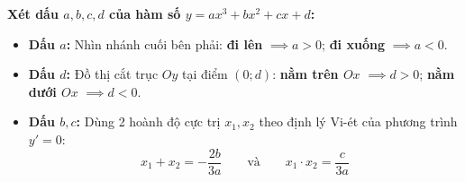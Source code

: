 \documentclass[12pt,a4paper]{article}
\begin{document}
\vspace{0.15cm}

\begin{theorybox}
    \textbf{Xét dấu $a, b, c, d$ của hàm số $y = ax^3 + bx^2 + cx + d$:}
    \begin{itemize}\setlength{\itemsep}{2pt}
        \item \textbf{Dấu $a$:} Nhìn nhánh cuối bên phải: \textbf{đi lên} $\implies a > 0$; \textbf{đi xuống} $\implies a < 0$.
        \item \textbf{Dấu $d$:} Đồ thị cắt trục $Oy$ tại điểm $(0; d)$: \textbf{nằm trên $Ox$} $\implies d > 0$; \textbf{nằm dưới $Ox$} $\implies d < 0$.
        \item \textbf{Dấu $b, c$:} Dùng 2 hoành độ cực trị $x_1, x_2$ theo định lý Vi-ét của phương trình $y' = 0$:
        \[
            x_1 + x_2 = -\frac{2b}{3a} \qquad \text{và} \qquad x_1 \cdot x_2 = \frac{c}{3a}
        \]
    \end{itemize}
\end{theorybox}

\vspace{0.15cm}


\vspace{0.15cm}
\end{document}

